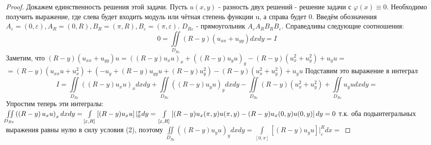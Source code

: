 \documentclass[a4paper, 9pt]{article}
\begin{document}
	\begin{proof}
		Докажем единственность решения этой задачи. Пусть $u(x,y)$ - разность двух решений - решение задачи с $\varphi(x) \equiv 0$. Необходимо получить выражение, где слева будет входить модуль или чётная степень функции u, а справа будет 0.\newline
		Введём обозначения $A_\varepsilon = (0, \varepsilon), A_R = (0, R), B_R = (\pi, R), B_\varepsilon = (\pi, \varepsilon)$. $D_{R\varepsilon}$ - прямоугольник $A_\varepsilon A_R B_R B_\varepsilon$. Справедливы следующие соотношения:
		\begin{equation*}
			0 = \iint\limits_{D_{R\varepsilon}} (R-y) (u_{xx} + u_{yy}) dx dy = I
		\end{equation*}
		Заметим, что 
		\begin{math}
			(R - y) (u_{xx} + u_{yy}) u = \left( \left(R - y\right) u_x u\right)_x  + \left( \left(R - y\right) u_y u\right)_y - \left(R- y\right) \left(u_x^2 + u_y^2\right) +  u_y u = 
		\end{math}
		\begin{math}
			= \left(R-y\right) \left(u_{xx} u + u_x^2\right) + \left(-u_y + \left(R-y\right) u_{yy} u + \left(R-y\right)u_y^2\right) - \left(R- y\right) \left(u_x^2 + u_y^2\right)+  u_y u
		\end{math}
		\newline Подставим это выражение в интеграл
		\begin{equation*}
			I	=	\iint\limits_{D_{R\varepsilon}} \left( \left(R - y\right) u_x u\right)_x dx dy  + \iint\limits_{D_{R\varepsilon}} \left( \left(R - y\right) u_y u\right)_y dx dy  
			- \iint\limits_{D_{R\varepsilon}} \left(R- y\right) \left(u_x^2 + u_y^2\right) + \iint\limits_{D_{R\varepsilon}} u_y u dx dy = 
		\end{equation*}
		Упростим теперь эти интегралы:\newline
		\begin{math}
			\iint\limits_{D_{R\varepsilon}} \left( \left(R - y\right) u_x u\right)_x dx dy = \int\limits_{[\varepsilon, R]} \left[(R-y)u_xu\right] \vert_0^\pi dy = \\ \int\limits_{[\varepsilon, R]} \left[(R-y) u_x(\pi, y)u(\pi,y) - (R-y) u_x(0, y)u(0,y)\right]dy = 0
		\end{math}
		т.к. оба подынтегральных выражения равны нулю в силу условия (2), поэтому \newline
		\begin{math}
			\iint\limits_{D_{R\varepsilon}} \left( \left(R - y\right) u_y u\right)_y dx dy = \int\limits_{[0,\pi]} \left[\left(R - y\right) u_y u\right] \vert_\varepsilon^R dx =

\end{math}
\end{proof}
\end{document}
